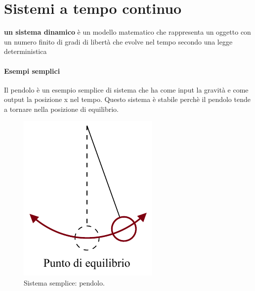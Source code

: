 
\chapter{Sistemi a tempo continuo}

	\begin{definizione}
		\textbf{un sistema dinamico} è un modello matematico che rappresenta un oggetto con un numero finito di gradi di libertà che evolve nel tempo secondo  una legge deterministica
	\end{definizione}
	\subsubsection{Esempi semplici}
		\begin{nexample}
			Il pendolo è un esempio semplice di sistema che ha come input la gravità e come output la posizione x nel tempo.
			Questo sistema è stabile perchè il pendolo tende a tornare nella posizione di equilibrio.
			
			\begin{figure}[H]
				\centering
				\includegraphics[scale=0.25]{immagini/cap3_Sistemi/pendolo}
				\caption{ Sistema semplice: pendolo. }
				\label{fig: pendolo}
			\end{figure}
			

\end{nexample}
